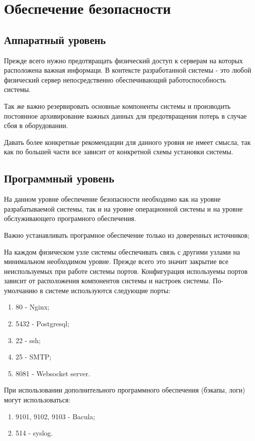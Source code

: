 \section{Обеспечение безопасности}
\subsection{Аппаратный уровень}
Прежде всего нужно предотвращать физический доступ к серверам на которых
расположена важная информаци. В контексте разработанной системы - это любой
физический сервер непосредственно обеспечивающий работоспособность системы.

Так же важно резервировать основные компоненты системы и производить постоянное
архивирование важных данных для предотвращения потерь в случае сбоя в
оборудовании.

Давать более конкретные рекомендации для данного уровня не имеет смысла, так как
по большей части все зависит от конкретной схемы установки системы.

\subsection{Программный уровень}
На данном уровне обеспечение безопасности необходимо как на уровне
разрабатываемой системы, так и на уровне операционной системы и на уровне
обслуживающего програмного обеспечения.

Важно устанавливать програмное обеспечение только из доверенных источников;

На каждом физическом узле системы обеспечивать связь с другими узлами на
минимальном необходимом уровне. Прежде всего это значит закрытие все
неиспользуемых при работе системы портов. Конфигурация используемы портов
зависит от расположения компонентов системы и настроек системы. По-умолчанию в
системе используются следующие порты:
\begin{enumerate}
  \item 80 - Nginx;
  \item 5432 - Postgresql;
  \item 22 - ssh;
  \item 25 - SMTP;
  \item 8081 - Websocket server.   
\end{enumerate}

При использовании дополнительного программного обеспечения (бэкапы, логи) могут
использоваться:
\begin{enumerate}
  \item 9101, 9102, 9103 - Bacula;
  \item 514 - syslog.   
\end{enumerate}

